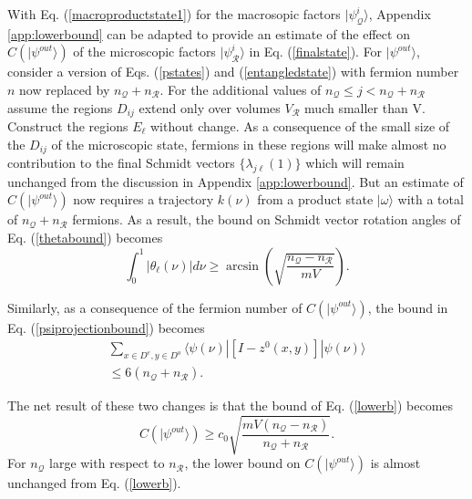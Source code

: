 \documentclass[twocolumn,amsmath,amssymb]{revtex4-1}
\begin{document}
With Eq. (\ref{macroproductstate1}) for the macrosopic factors $|\psi^i_{\mathcal{Q}} \rangle $,
Appendix \ref{app:lowerbound} can be adapted to provide an
estimate of the effect on $C( |\psi^{out} \rangle )$
of the microscopic factors $|\psi^i_{\mathcal{R}} \rangle $ in Eq. (\ref{finalstate}). 
For $|\psi^{out} \rangle $, consider a version of Eqs. (\ref{pstates}) and (\ref{entangledstate}) 
with fermion number $n$ now replaced by $n_{\mathcal{Q}} + n_{\mathcal{R}}$. 
For the additional values of $n_{\mathcal{Q}} \le j < n_{\mathcal{Q}} + n_{\mathcal{R}}$
assume the regions $D_{ij}$ extend only over volumes $V_{\mathcal{R}}$ much smaller than V.
Construct the regions $E_\ell$ without change.  As a consequence
of the small size of the $D_{ij}$ of the microscopic state, fermions in these
regions will make almost no contribution to the final Schmidt vectors
$\{\lambda_{j\ell} (1)\}$ which will remain unchanged from the discussion in 
Appendix \ref{app:lowerbound}.
But an estimate of 
$C( |\psi^{out} \rangle )$ now requires a trajectory $k(\nu)$ from a product state $|\omega \rangle $ with a total of
$n_{\mathcal{Q}} + n_{\mathcal{R}}$ fermions. As a result, the bound on Schmidt vector
rotation angles of Eq. (\ref{thetabound}) becomes
\begin{equation}
\label{thetaboundscattering}
\int_0^1 | \theta_{\ell}(\nu)| d \nu \ge \arcsin( \sqrt{\frac{n_{\mathcal{Q}} - n_{\mathcal{R}}}{mV}}).
\end{equation}

Similarly, as a consequence of the fermion number of $C( |\psi^{out} \rangle )$,
the bound in Eq. (\ref{psiprojectionbound}) becomes 
\begin{multline}
\label{psiprojectionboundscattering}
\sum_{x \in D^e, y \in D^o}  \langle \psi(\nu)| [I - z^0(x,y)]|\psi(\nu) \rangle  \\ \le 6(n_{\mathcal{Q}} + n_{\mathcal{R}}).
\end{multline}

The net result of these two changes is that the bound of Eq. (\ref{lowerb}) becomes
\begin{equation}
\label{cbound1}
C( |\psi^{out} \rangle ) \ge c_0 \sqrt{ \frac{mV(n_{\mathcal{Q}} - n_{\mathcal{R}})}{n_{\mathcal{Q}} + n_{\mathcal{R}}}}.
\end{equation}
For $n_{\mathcal{Q}}$ large with respect to $n_{\mathcal{R}}$, the lower bound on 
$C( |\psi^{out} \rangle )$ is almost unchanged from Eq. (\ref{lowerb}). 
\end{document}
